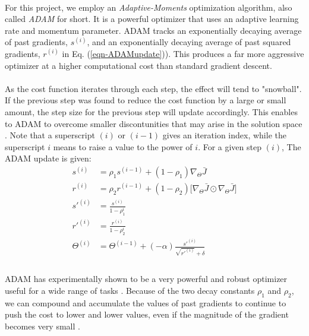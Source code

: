 \documentclass[12pt,letterpaper]{article}
\begin{document}
\paragraph*{}For this project, we employ an \textit{Adaptive-Moments} optimization algorithm, also called \textit{ADAM} for short. It is a powerful optimizer that uses an adaptive learning rate and momentum parameter. ADAM tracks an exponentially decaying average of past gradients, $s^{(i)}$, and an exponentially decaying average of past squared gradients, $r^{(i)}$ in Eq. (\ref{eqn-ADAMupdate}))\cite{Geron}. This produces a far more aggressive optimizer at a higher computational cost than standard gradient descent.

\paragraph*{}As the cost function iterates through each step, the effect will tend to "snowball". If the previous step was found to reduce the cost function by a large or small amount, the step size for the previous step will update accordingly. This enables to ADAM to overcome smaller discontunities that may arise in the solution space \cite{Goodfellow}. Note that a superscript $(i)$ or $(i-1)$ gives an iteration index, while the superscript $i$ means to raise a value to the power of $i$. For a given step $(i)$, The ADAM update is given:
\begin{equation}
\label{eqn-ADAMupdate}
\begin{split}
s^{(i)} &= \rho_1 s^{(i-1)} + (1 - \rho_1) \nabla_{\Theta} \bar{J}  \\
r^{(i)} &= \rho_2 r^{(i-1)} + (1 - \rho_2) \Big[ \nabla_{\Theta} \bar{J} \odot \nabla_{\Theta} \bar{J} \Big]  \\
s'^{(i)} &= \frac{s^{(i)}}{1-\rho_1^i} \\
r'^{(i)} &= \frac{r^{(i)}}{1-\rho_2^i} \\
\Theta^{(i)} &= \Theta^{(i-1)} + (-\alpha)\frac{s'^{(i)}}{\sqrt{r'^{(i)}}+\delta} \\
\end{split}
\end{equation}

\paragraph*{}ADAM has experimentally shown to be a very powerful and robust optimizer useful for a wide range of tasks \cite{Goodfellow}. Because of the two decay constants $\rho_1$ and $\rho_2$, we can compound and accumulate the values of past gradients to continue to push the cost to lower and lower values, even if the magnitude of the gradient becomes very small \cite{Geron}. 
\end{document}

